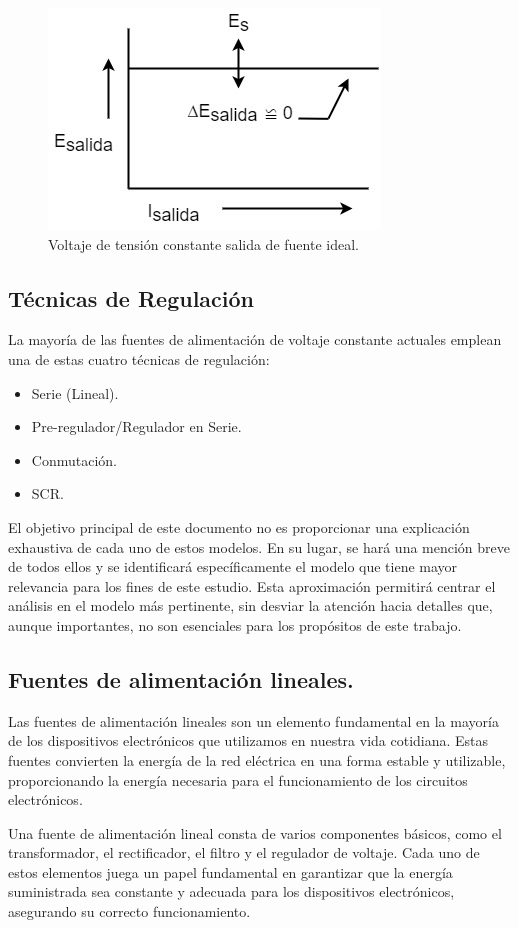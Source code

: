 \begin{figure}
    \centering
    \includegraphics[scale=0.5]{./imagenes/salidaidealfuentedc.jpg}
    \caption{Voltaje de tensión constante salida de fuente ideal.}
    \label{F:salidaidealfuentedc}
\end{figure}

\subsection{Técnicas de Regulación}\par 
La mayoría de las fuentes de alimentación de voltaje constante actuales emplean una de estas cuatro técnicas de regulación:
\begin{itemize}
    \item Serie (Lineal).
    \item Pre-regulador/Regulador en Serie.
    \item Conmutación.
    \item SCR.
\end{itemize}\par 

El objetivo principal de este documento no es proporcionar una explicación exhaustiva de cada uno de estos modelos. En su lugar, se hará una mención breve de todos ellos y se identificará específicamente el modelo que tiene mayor relevancia para los fines de este estudio. Esta aproximación permitirá centrar el análisis en el modelo más pertinente, sin desviar la atención hacia detalles que, aunque importantes, no son esenciales para los propósitos de este trabajo.


\subsection{Fuentes de alimentación lineales.} \par 
Las fuentes de alimentación lineales son un elemento fundamental en la mayoría de los dispositivos electrónicos que utilizamos en nuestra vida cotidiana. Estas fuentes convierten la energía de la red eléctrica en una forma estable y utilizable, proporcionando la energía necesaria para el funcionamiento de los circuitos electrónicos. \par
Una fuente de alimentación lineal consta de varios componentes básicos, como el transformador, el rectificador, el filtro y el regulador de voltaje. Cada uno de estos elementos juega un papel fundamental en garantizar que la energía suministrada sea constante y adecuada para los dispositivos electrónicos, asegurando su correcto funcionamiento.

